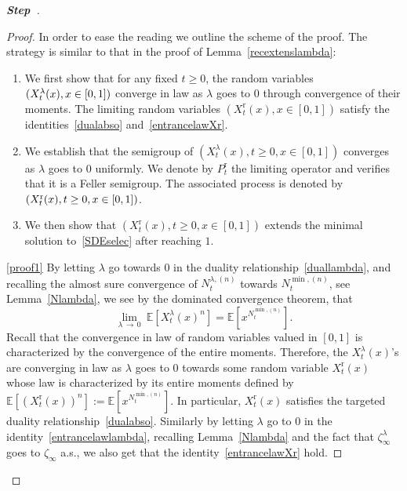 \documentclass[AHL,Unicode,longabstracts,published]{cedram}
\newcommand{\rmr}{\mathrm{r}}
\newcommand{\bbE}{\mathbb{E}}
\newcounter{stepcount}
\newenvironment{step}{\refstepcounter{stepcount}\begin{proof}[\textbf{Step~\thestepcount}]}{\end{proof}}
\begin{document}
\begin{step}
\begin{proof}
In order to ease the reading we outline the scheme of the proof. The strategy is similar to that in the proof of Lemma~\ref{recextenslambda}:
\begin{enumerate}
\item\label{proof1} We first show that for any fixed $t\geq 0$, the random variables $(X_t^{\lambda}(x),\linebreak x \in[0,1])$ converge in law as $\lambda$ goes to $0$ through convergence of their moments. The limiting random variables $(X_t^{\rmr}(x),x\in [0,1])$ satisfy the identities~\eqref{dualabso} and~\eqref{entrancelawXr}.
\item\label{proof2} We establish that the semigroup of $(X^{\lambda}_t(x),t\geq 0, x\in [0,1])$ converges as $\lambda$ goes to $0$ uniformly. We denote by $P_t^{\rmr}$ the limiting operator and verifies that it is a Feller semigroup. The associated process is denoted by $(X^{\rmr}_t(x),\linebreak t\geq 0,x\in [0,1])$.
\item\label{proof3} We then show that $(X^{\rmr}_t(x),t\geq 0,x\in [0,1])$ extends the minimal solution to~\eqref{SDEselec} after reaching $1$.
\end{enumerate}
\eqref{proof1} By letting $\lambda$ go towards $0$ in the duality relationship~\eqref{duallambda}, and recalling the almost sure convergence of $N_t^{\lambda,(n)}$ towards $N_t^{\min,(n)}$, see Lemma~\ref{Nlambda}, we see by the dominated convergence theorem, that
\[
\underset{\lambda\,\rightarrow\,0}{\lim}\ \bbE\left[X_t^{\lambda}(x)^{n}\right]=\bbE\left[x^{N_t^{\min,(n)}}\right].
\]
Recall that the convergence in law of random variables valued in $[0,1]$ is characterized by the convergence of the entire moments. Therefore, the $X_t^{\lambda}(x)$'s are converging in law as $\lambda$ goes to $0$ towards some random variable $X_t^{\rmr}(x)$ whose law is characterized by its entire moments defined by $\bbE[(X^{\rmr}_t(x))^{n}]:=\bbE[x^{N_t^{\min,(n)}}]$. In particular, $X_t^{\rmr}(x)$ satisfies the targeted duality relationship~\eqref{dualabso}. Similarly by letting $\lambda$ go to $0$ in the identity~\eqref{entrancelawlambda}, recalling Lemma~\ref{Nlambda} and the fact that $\zeta_\infty^{\lambda}$ goes to $\zeta_{\infty}$ a.s., we also get that the identity~\eqref{entrancelawXr} hold.


\end{proof}
\end{step}
\end{document}
